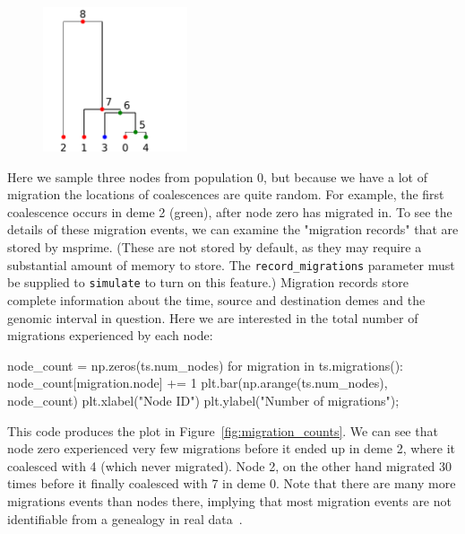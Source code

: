 \documentclass[graybox]{svmult}
\newcommand{\includenbimage}[1]{\begin{center}\texttt{[image: \#1]}\end{center}}
\begin{document}
\begin{figure}
  \begin{center}
    \includegraphics[width=0.38\textwidth]{images/simulations_28_0.pdf}
    \end{center}
\end{figure}

    Here we sample three nodes from population 0, but because we have a lot
of migration the locations of coalescences are quite random. For
example, the first coalescence occurs in deme 2 (green), after node zero
has migrated in. To see the details of these migration events, we can
examine the "migration records" that are stored by msprime. (These are
not stored by default, as they may require a substantial amount of
memory to store. The \texttt{record\_migrations} parameter must be
supplied to \texttt{simulate} to turn on this feature.) Migration
records store complete information about the time, source and
destination demes and the genomic interval in question. Here we are
interested in the total number of migrations experienced by each node:

\begin{pythoncode}
node_count = np.zeros(ts.num_nodes)
for migration in ts.migrations():
    node_count[migration.node] += 1
plt.bar(np.arange(ts.num_nodes), node_count)
plt.xlabel("Node ID")
plt.ylabel("Number of migrations");
\end{pythoncode}

This code produces the plot in Figure~\ref{fig:migration_counts}.
We can see that node zero experienced very few migrations before it
ended up in deme 2, where it coalesced with 4 (which never migrated).
Node 2, on the other hand migrated 30 times before it finally coalesced
with 7 in deme 0. Note that there are many more migrations events than
nodes there, implying that most migration events are not identifiable
from a genealogy in real data~\citep{sousa2011nonidentifiability}.
\end{document}
